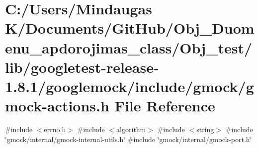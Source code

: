 \hypertarget{_obj__test_2lib_2googletest-release-1_88_81_2googlemock_2include_2gmock_2gmock-actions_8h}{}\section{C\+:/\+Users/\+Mindaugas K/\+Documents/\+Git\+Hub/\+Obj\+\_\+\+Duomenu\+\_\+apdorojimas\+\_\+class/\+Obj\+\_\+test/lib/googletest-\/release-\/1.8.1/googlemock/include/gmock/gmock-\/actions.h File Reference}
\label{_obj__test_2lib_2googletest-release-1_88_81_2googlemock_2include_2gmock_2gmock-actions_8h}
{\ttfamily \#include $<$errno.\+h$>$}\newline
{\ttfamily \#include $<$algorithm$>$}\newline
{\ttfamily \#include $<$string$>$}\newline
{\ttfamily \#include \char`\"{}gmock/internal/gmock-\/internal-\/utils.\+h\char`\"{}}\newline
{\ttfamily \#include \char`\"{}gmock/internal/gmock-\/port.\+h\char`\"{}}\newline
